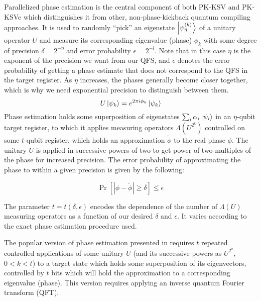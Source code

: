 Parallelized phase estimation is the central component of both
PK-KSV and PK-KSVe which distinguishes it from other,
non-phase-kickback quantum
compiling approaches. It is used to randomly ``pick'' an
eigenstate $\left\vert{\psi_{\eta}^{(k)}}\right\rangle$ of a unitary operator $U$ and
measure its corresponding eigenvalue (phase) $\phi_k$
with some degree of precision $\delta = 2^{-{\eta}}$ and
error probability $\epsilon = 2^{-l}$. Note that in this
case $\eta$ is the exponent of the precision we want from
our QFS, and $\epsilon$ denotes the error probability of
getting a phase estimate that does not correspond to the
QFS in the target register.
 As ${\eta}$ increases, the phases
generally become closer together, which is why we need exponential precision
to distinguish between them.
%
\begin{equation}
U\left\vert{\psi_k}\right\rangle = e^{2\pi i \phi_k} \left\vert{\psi_k}\right\rangle
\end{equation}
%
Phase estimation holds some superposition of eigenstates
$\sum_{i} \alpha_i \left\vert{\psi_i}\right\rangle$
in an ${\eta}$-qubit target register, to which it applies measuring
operators $\Lambda(U^{2^k})$
controlled on some $t$-qubit register, which holds an
approximation $\tilde{\phi}$ to the real phase $\phi$.
The unitary $U$ is applied in successive powers of two to get
power-of-two multiples of the phase for increased precision.
The error probability of approximating the phase to within a given
precision is given by the following:

\begin{displaymath}
\Pr\left[ | \phi - \tilde{\phi} | \ge \delta \right] \le \epsilon
\end{displaymath}

The parameter $t = t(\delta, \epsilon)$ encodes the dependence of the number
of $\Lambda(U)$ measuring operators as a function of our desired
$\delta$ and $\epsilon$.
It varies according to the exact phase estimation procedure
used.

The popular version of phase estimation presented in \cite{Nielsen2000}
requires $t$ repeated controlled applications of some unitary
$U$ (and its successive powers as $U^{2^k}$, $0<k<t$)
to a target state which holds some superposition of its eigenvectors,
controlled by $t$ bits which will hold the approximation to a corresponding
eigenvalue (phase).
This version requires applying an inverse quantum Fourier
transform (QFT).

